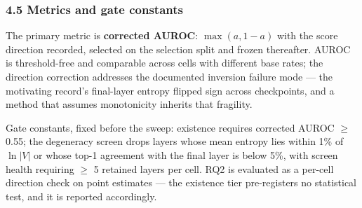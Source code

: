 \subsubsection{4.5 Metrics and gate constants}

The primary metric is \textbf{corrected AUROC}: $\max(a, 1-a)$ with the score direction recorded, selected on the selection split and frozen thereafter. AUROC is threshold-free and comparable across cells with different base rates; the direction correction addresses the documented inversion failure mode --- the motivating record's final-layer entropy flipped sign across checkpoints, and a method that assumes monotonicity inherits that fragility.

Gate constants, fixed before the sweep: existence requires corrected AUROC $\geq$ 0.55; the degeneracy screen drops layers whose mean entropy lies within 1\% of $\ln|V|$ or whose top-1 agreement with the final layer is below 5\%, with screen health requiring $\geq$ 5 retained layers per cell. RQ2 is evaluated as a per-cell direction check on point estimates --- the existence tier pre-registers no statistical test, and it is reported accordingly.
